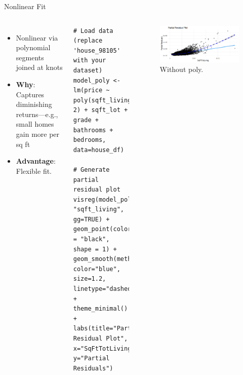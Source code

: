 \documentclass{beamer}
\begin{document}
	\begin{frame}[fragile]{Nonlinear Fit}
		\begin{columns}
			\begin{itemize}
				\item Nonlinear via polynomial segments joined at knots
				\item \textbf{Why}: Captures diminishing returns—e.g., small homes gain more per sq ft
				\item \textbf{Advantage}: Flexible fit.
			\end{itemize}
			\begin{lstlisting}
# Load data (replace 'house_98105' with your dataset)
model_poly <- lm(price ~ poly(sqft_living, 2) + sqft_lot +
grade + bathrooms + bedrooms, data=house_df)

# Generate partial residual plot
visreg(model_poly, "sqft_living", gg=TRUE) +
geom_point(color = "black", shape = 1) + 
geom_smooth(method="loess", color="blue", size=1.2, linetype="dashed") + 
theme_minimal() +
labs(title="Partial Residual Plot", x="SqFtTotLiving", y="Partial Residuals")
			\end{lstlisting}
			\begin{figure}
				\includegraphics[width=\linewidth]{without_poly.png}
				\caption{Without poly.}
			\end{figure}
		\end{columns}
	\end{frame}
	
\end{document}
